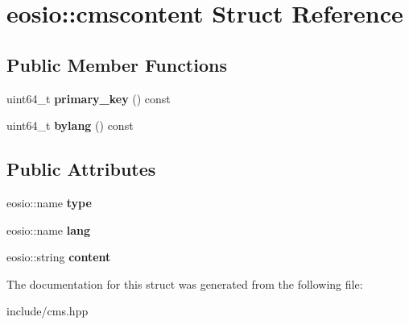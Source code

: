 \hypertarget{structeosio_1_1cmscontent}{}\section{eosio\+:\+:cmscontent Struct Reference}
\label{structeosio_1_1cmscontent}
\subsection*{Public Member Functions}
\begin{DoxyCompactItemize}
\item 
\mbox{\label{structeosio_1_1cmscontent_a9e9428636f08f8b440c013c7b5dcab4a}} 
uint64\+\_\+t {\bfseries primary\+\_\+key} () const
\item 
\mbox{\label{structeosio_1_1cmscontent_a8b013059c3c9c79346922cc087cf5ff4}} 
uint64\+\_\+t {\bfseries bylang} () const
\end{DoxyCompactItemize}
\subsection*{Public Attributes}
\begin{DoxyCompactItemize}
\item 
\mbox{\label{structeosio_1_1cmscontent_ae1b6965a198274daa25d996db1d46fe1}} 
eosio\+::name {\bfseries type}
\item 
\mbox{\label{structeosio_1_1cmscontent_a777a21db493ab84fca50ecd7aafc964a}} 
eosio\+::name {\bfseries lang}
\item 
\mbox{\label{structeosio_1_1cmscontent_aa6935986b4beb8dc31772fb6feb9ec3a}} 
eosio\+::string {\bfseries content}
\end{DoxyCompactItemize}


The documentation for this struct was generated from the following file\+:\begin{DoxyCompactItemize}
\item 
include/cms.\+hpp\end{DoxyCompactItemize}
